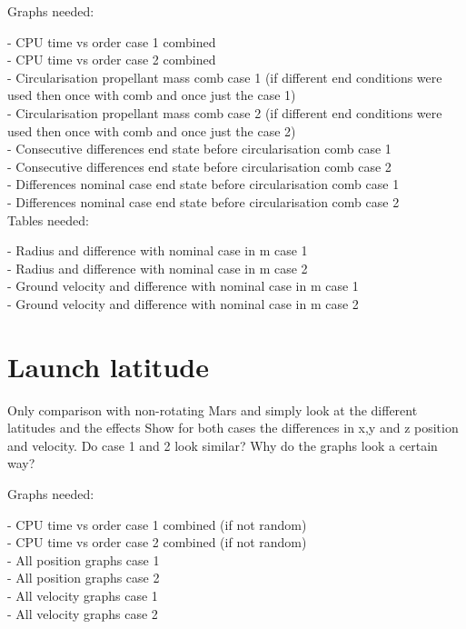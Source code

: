 Graphs needed:

- CPU time vs order case 1 combined \\
- CPU time vs order case 2 combined \\
- Circularisation propellant mass comb case 1 (if different end conditions were used then once with comb and once just the case 1) \\
- Circularisation propellant mass comb case 2 (if different end conditions were used then once with comb and once just the case 2) \\
- Consecutive differences end state before circularisation comb case 1 \\
- Consecutive differences end state before circularisation comb case 2 \\
- Differences nominal case end state before circularisation comb case 1 \\
- Differences nominal case end state before circularisation comb case 2 \\


Tables needed:

- Radius and difference with nominal case in m case 1 \\
- Radius and difference with nominal case in m case 2 \\
- Ground velocity and difference with nominal case in m case 1 \\
- Ground velocity and difference with nominal case in m case 2 \\





\section{Launch latitude}
\label{sec:launchLatitude}

Only comparison with non-rotating Mars and simply look at the different latitudes and the effects
Show for both cases the differences in x,y and z position and velocity. Do case 1 and 2 look similar? Why do the graphs look a certain way?

Graphs needed:

- CPU time vs order case 1 combined (if not random) \\
- CPU time vs order case 2 combined (if not random) \\
- All position graphs case 1 \\
- All position graphs case 2 \\
- All velocity graphs case 1 \\
- All velocity graphs case 2 \\


